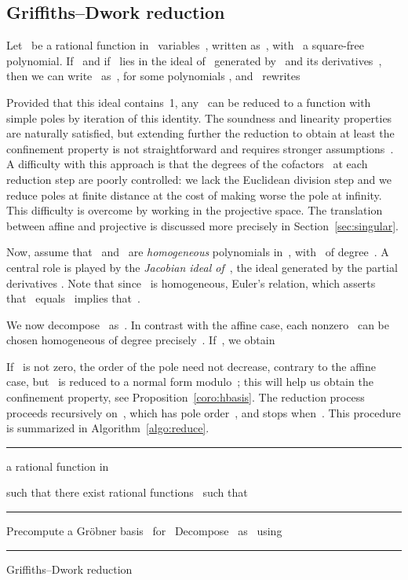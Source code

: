 \documentclass{sig-alternate}
\newenvironment{algoenv}[3][\linewidth]{
\begin{minipage}{#1}\flushleft
\rule{\textwidth}{.08em}\vspace{-\baselineskip}\smallskip
\begin{description}[noitemsep]
\item[\rlap{Input}\phantom{Output}] #2
\item[Output] #3
\end{description}
\vspace{-\baselineskip}
\rule{\textwidth}{.05em}
\begin{algorithmic}
}{\end{algorithmic}
\vspace{-.5\baselineskip}
\rule{\textwidth}{.08em}
\end{minipage}}
\begin{document}
\subsection{Griffiths--Dwork reduction}
\noindent Let~ be a rational function in~ variables~, written as~, with~ a square-free polynomial.
If~ and if~ lies in the ideal of~ generated by~ and its derivatives~,
then we can write~ as~,
for some polynomials , and~ rewrites

Provided that  this ideal contains~1,
any~ can be reduced to a function with simple poles by iteration of this identity.
The soundness and linearity properties are naturally satisfied, but extending further the reduction
to obtain at least the confinement property is not straightforward and requires stronger assumptions~\cite[\S 4]{Mov11a}.
A difficulty with this approach is that the degrees of the cofactors~ at each reduction step are poorly controlled: we lack the Euclidean division step and we reduce poles at finite distance at the cost of making worse the pole at infinity. This difficulty is overcome by working in the projective space. The translation between affine and projective is discussed more precisely in Section~\ref{sec:singular}.

Now, assume that~ and~ are \emph{homogeneous} polynomials in~, with~ of degree~.
A central role is played by the \emph{Jacobian ideal  of~}, the ideal generated by the partial derivatives .
Note that since~ is homogeneous, Euler's relation, which asserts that~ equals~
implies that~. 

We now decompose~ as~. In contrast with the
affine case, each nonzero~ can be chosen homogeneous of degree precisely~.
If~, we obtain

If~ is not zero, the order of the pole need not decrease, contrary to the affine case,  
but~ is reduced to a normal form modulo~; this will help us obtain the confinement property, see Proposition~\ref{coro:hbasis}.
The reduction process proceeds recursively on~,  which has pole order~, and stops when~.
This procedure is summarized in Algorithm~\ref{algo:reduce}.

\begin{algo}
\centering
\begin{algoenv}{
     a rational function in~
  }{ such that there exist rational functions~ such that }
  \State Precompute a Gr\"obner basis~ for~
  \If{} \Return 
  \EndIf
  \State Decompose~ as~ using~
  \State 
  \State \Return 
  \EndProcedure
\end{algoenv}
\caption{Griffiths--Dwork reduction}
\label{algo:reduce}
\end{algo}
\end{document}
